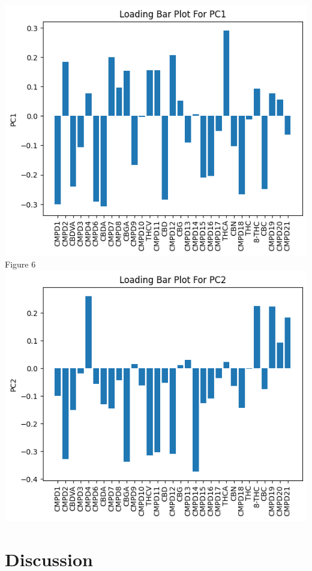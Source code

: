 \documentclass{article}
\begin{document}
\centering
\includegraphics{PC1.png}
{Figure 6}
\centering
\includegraphics{PC2.png}



\section{Discussion}
\end{document}
